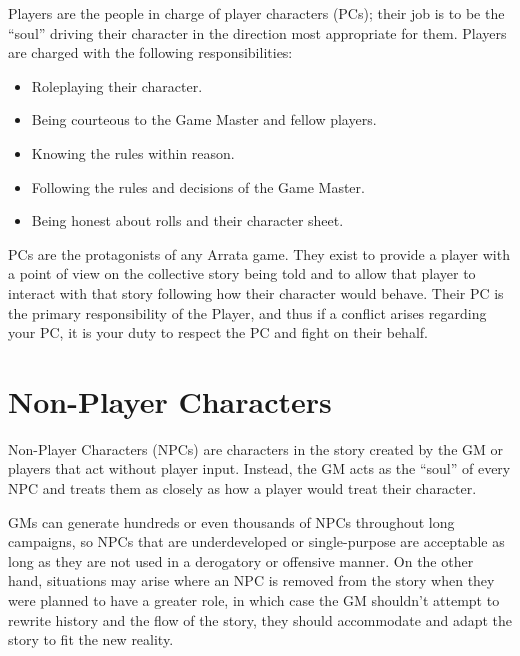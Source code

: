 \documentclass[../main.tex]{subfiles}
\begin{document}
    Players are the people in charge of player characters (PCs); their job is to be the ``soul'' driving their character in the direction most appropriate for them. Players are charged with the following responsibilities:

    \begin{itemize}
        \item Roleplaying their character.
        \item Being courteous to the Game Master and fellow players.
        \item Knowing the rules within reason.
        \item Following the rules and decisions of the Game Master.
        \item Being honest about rolls and their character sheet.
    \end{itemize}

    PCs are the protagonists of any Arrata game. They exist to provide a player with a point of view on the collective story being told and to allow that player to interact with that story following how their character would behave. Their PC is the primary responsibility of the Player, and thus if a conflict arises regarding your PC, it is your duty to respect the PC and fight on their behalf.

    \section{Non-Player Characters}
    Non-Player Characters (NPCs) are characters in the story created by the GM or players that act without player input. Instead, the GM acts as the ``soul'' of every NPC and treats them as closely as how a player would treat their character. 
    
    GMs can generate hundreds or even thousands of NPCs throughout long campaigns, so NPCs that are underdeveloped or single-purpose are acceptable as long as they are not used in a derogatory or offensive manner. On the other hand, situations may arise where an NPC is removed from the story when they were planned to have a greater role, in which case the GM shouldn't attempt to rewrite history and the flow of the story, they should accommodate and adapt the story to fit the new reality.
\end{document}
